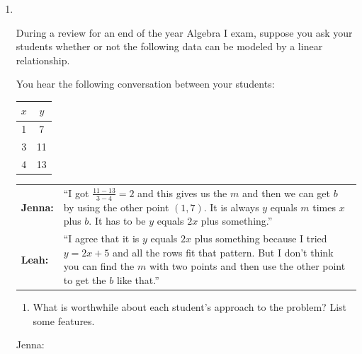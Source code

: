 \documentclass[10pt]{article}
\begin{document}
\begin{enumerate}[resume]

\item %
$\;$ \\ 

\vspace*{-15.5pt} \begin{minipage}{4.8in}\raggedright \parskip4pt
During a review for an end of the year Algebra I exam, suppose you ask your students whether or not the following data can be modeled by a linear relationship. 

You hear the following conversation between your students:
\end{minipage} \hspace*{10pt}
\begin{minipage}{1in}
\begin{center}
\begin{tabular}{c|c}
$x$ & $y$ \\ \hline
1 & 7 \\
3 & 11 \\
4 & 13
\end{tabular} 
\end{center}
\end{minipage}

\hspace*{-4.5pt}\begin{tabular}{L{0.4in}L{5.4in}}
{\bf Jenna:} &  ``I got $\frac{11-13}{3-4} = 2$ and this gives us the $m$ and then we can get $b$ by using the other point $(1,7)$. It is always $y$ equals $m$ times $x$ plus $b$. It has to be $y$ equals $2x$ plus something.''  \\  
{\bf Leah:} &  ``I agree that it is $y$ equals $2x$ plus something because I tried $y=2x+5$ and all the rows fit that pattern. But I don't think you can find the $m$ with two points and then use the other point to get the $b$ like that.''
\end{tabular}

	\begin{enumerate}
	\item What is worthwhile about each student's approach to the problem? List some features.
	\end{enumerate}
	
		\vspace*{-12pt}\begin{mdframed} Jenna: \vspace*{1.2in} \end{mdframed}
		

\end{enumerate}
\end{document}
